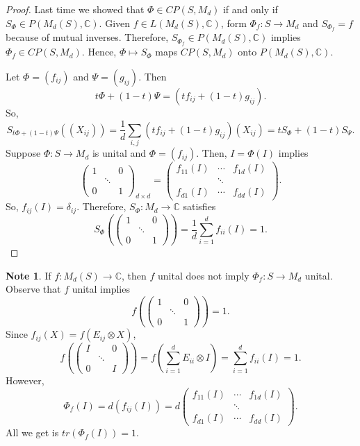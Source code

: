 \documentclass[12pt]{article}
\theoremstyle{definition}
\newtheorem*{note}{Note}
\newcommand{\C}{\mathbb{C}}
\begin{document}
\begin{proof}
Last time we showed that $\Phi \in CP(S,M_d)$ if and only if $S_\Phi \in P(M_d(S),\C)$. Given $f \in L(M_d(S),\C)$, form $\Phi_f:S \to M_d$ and $S_{\Phi_f}=f$ because of mutual inverses. Therefore, $S_{\Phi_f} \in P(M_d(S),\C)$ implies $\Phi_f \in CP(S,M_d)$. Hence, $\Phi \mapsto S_\Phi$ maps $CP(S,M_d)$ onto $P(M_d(S),\C)$.

Let $\Phi=(f_{ij})$ and $\Psi=(g_{ij})$. Then
\[
t\Phi+(1-t)\Psi = (tf_{ij}+(1-t)g_{ij}).
\]
So,
\[
S_{t\Phi+(1-t)\Psi}((X_{ij})) = \frac{1}{d}\sum_{i,j}(tf_{ij}+(1-t)g_{ij})(X_{ij}) = tS_\Phi + (1-t)S_\Psi.
\]
Suppose $\Phi:S \to M_d$ is unital and $\Phi=(f_{ij})$. Then, $I=\Phi(I)$ implies
\[
\begin{pmatrix}1 & & 0\\ & \ddots & \\ 0 & & 1\end{pmatrix}_{d\times d} = \begin{pmatrix}f_{11}(I) & \cdots & f_{1d}(I)\\ & \ddots & \\ f_{d1}(I) & \cdots & f_{dd}(I)\end{pmatrix}.
\]
So, $f_{ij}(I)=\delta_{ij}$. Therefore, $S_\Phi:M_d \to \C$ satisfies
\[
S_\Phi\left(\begin{pmatrix}1 & & 0\\ & \ddots & \\ 0 & & 1\end{pmatrix}\right) = \frac{1}{d}\sum_{i=1}^d f_{ii}(I) = 1.
\]
\end{proof}

\begin{note}
If $f:M_d(S) \to \C$, then $f$ unital does not imply $\Phi_f:S \to M_d$ unital. Observe that $f$ unital implies
\[
f\left(\begin{pmatrix}1 & & 0\\ & \ddots & \\ 0 & & 1\end{pmatrix}\right) = 1.
\]
Since $f_{ij}(X)=f(E_{ij} \otimes X)$,
\[
f\left(\begin{pmatrix}I & & 0\\ & \ddots & \\ 0 & & I\end{pmatrix}\right) = f\left(\sum_{i=1}^d E_{ii} \otimes I\right) = \sum_{i=1}^d f_{ii}(I) = 1.
\]
However,
\[
\Phi_f(I) = d(f_{ij}(I)) = d\begin{pmatrix}f_{11}(I) & \cdots & f_{1d}(I)\\ & \ddots & \\ f_{d1}(I) & \cdots & f_{dd}(I)\end{pmatrix}.
\]
All we get is $tr(\Phi_f(I))=1$.
\end{note}
\end{document}
